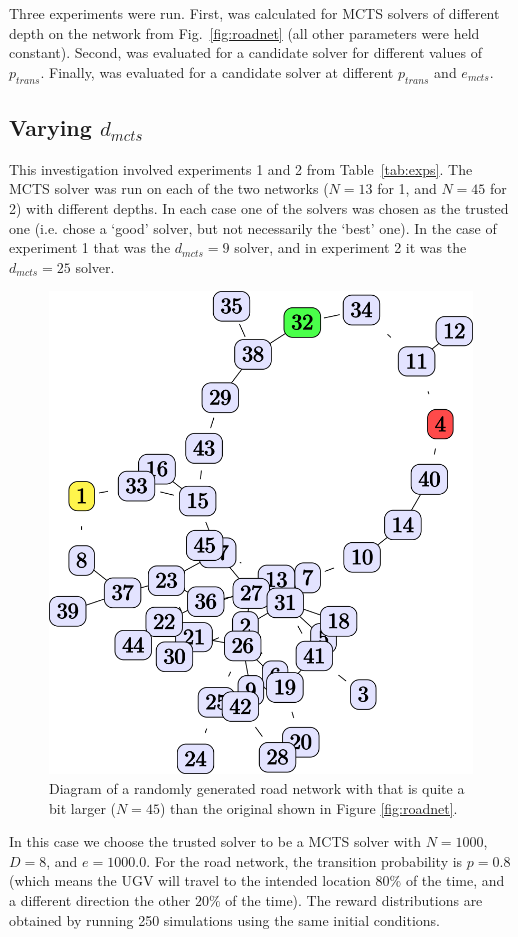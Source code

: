 Three experiments were run. First, \xQ{} was calculated for MCTS solvers of different depth on the network from Fig.~\ref{fig:roadnet} (all other parameters were held constant). Second, \xQ{} was evaluated for a candidate solver for different values of $p_{trans}$. Finally, \xQ{} was evaluated for a candidate solver at different $p_{trans}$ and $e_{mcts}$.

\subsection{Varying $d_{mcts}$}
This investigation involved experiments 1 and 2 from Table~\ref{tab:exps}. The MCTS solver was run on each of the two networks ($N=13$ for 1, and $N=45$ for 2) with different depths. In each case one of the solvers was chosen as the trusted one (i.e. chose a `good' solver, but not necessarily the `best' one). In the case of experiment 1 that was the $d_{mcts}=9$ solver, and in experiment 2 it was the $d_{mcts}=25$ solver.

\begin{figure}[tbp]
    \centering
    \includegraphics[width=0.4\linewidth]{Figures/medium_roadnet.png}
    \caption{Diagram of a randomly generated road network with that is quite a bit larger ($N=45$) than the original shown in Figure \ref{fig:roadnet}.}
    \label{fig:med_roadnet}
\end{figure}

In this case we choose the trusted solver to be a MCTS solver with $N=1000$, $D=8$, and $e=1000.0$. For the road network, the transition probability is $p=0.8$ (which means the UGV will travel to the intended location $80\%$ of the time, and a different direction the other $20\%$ of the time). The reward distributions are obtained by running 250 simulations using the same initial conditions.

